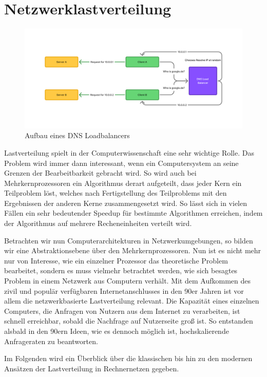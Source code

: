 \chapter{Netzwerklastverteilung}
\begin{figure}
    \centering
    \includegraphics[width=1.1\linewidth]{images/DNS Loadbalancer(1).png}
    \caption{Aufbau eines DNS Loadbalancers}
    \label{fig:enter-label}
\end{figure}
Lastverteilung spielt in der Computerwissenschaft eine sehr wichtige Rolle. Das Problem wird immer dann interessant, wenn ein Computersystem an seine Grenzen der Bearbeitbarkeit gebracht wird. So wird auch bei Mehrkernprozessoren ein Algorithmus derart aufgeteilt, dass jeder Kern ein Teilproblem löst, welches nach Fertigstellung des Teilproblems mit den Ergebnissen der anderen Kerne zusammengesetzt wird. So lässt sich in vielen Fällen ein sehr bedeutender Speedup für bestimmte Algorithmen erreichen, indem der Algorithmus auf mehrere Recheneinheiten verteilt wird. \cite{lbtheory}

Betrachten wir nun Computerarchitekturen in Netzwerkumgebungen, so bilden wir eine Abstraktionsebene über den Mehrkernprozessoren. Nun ist es nicht mehr nur von Interesse, wie ein einzelner Prozessor das theoretische Problem bearbeitet, sondern es muss vielmehr betrachtet werden, wie sich besagtes Problem in einem Netzwerk aus Computern verhält. Mit dem Aufkommen des zivil und populär verfügbaren Internetanschlusses in den 90er Jahren ist vor allem die netzwerkbasierte Lastverteilung relevant. Die Kapazität eines einzelnen Computers, die Anfragen von Nutzern aus dem Internet zu verarbeiten, ist schnell erreichbar, sobald die Nachfrage auf Nutzerseite groß ist. So entstanden alsbald in den 90ern Ideen, wie es dennoch möglich ist, hochskalierende Anfrageraten zu beantworten. 

Im Folgenden wird ein Überblick über die klassischen bis hin zu den modernen Ansätzen der Lastverteilung in Rechnernetzen gegeben.

